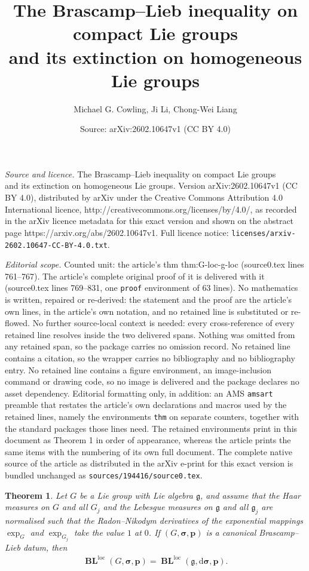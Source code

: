 \documentclass[10pt,a4paper]{amsart}
\title{The Brascamp--Lieb inequality on compact Lie groups \\ and its extinction on homogeneous Lie groups}
\author{Michael G. Cowling, Ji Li, Chong-Wei Liang}
\date{Source: arXiv:2602.10647v1 (CC BY 4.0)}
\newtheorem{thm}{Theorem}
\newcommand{\BL}{\operatorname{\mathbf{BL}}}
\newcommand{\Lie}[1]{\mathfrak{#1}}
\newcommand{\bsDs}{\boldsymbol{\mathrm{d}\sigma}}
\newcommand{\bsp}{\boldsymbol{p}}
\newcommand{\bss}{\boldsymbol{\sigma}}
\newcommand{\loc}{\mathrm{loc}}
\begin{document}
\maketitle

\noindent\emph{Source and licence.} The Brascamp--Lieb inequality on compact Lie groups \\ and its extinction on homogeneous Lie groups. Version arXiv:2602.10647v1 (CC BY 4.0), distributed by arXiv under the Creative Commons Attribution 4.0 International licence, http://creativecommons.org/licenses/by/4.0/, as recorded in the arXiv licence metadata for this exact version and shown on the abstract page https://arxiv.org/abs/2602.10647v1. Full licence notice: \texttt{licenses/arxiv-2602.10647-CC-BY-4.0.txt}.\par\smallskip

\noindent\textit{Editorial scope.} Counted unit: the article's thm thm:G-loc-g-loc (source0.tex lines 761--767). The article's complete original proof of it is delivered with it (source0.tex lines 769--831, one \texttt{proof} environment of 63 lines). No mathematics is written, repaired or re-derived: the statement and the proof are the article's own lines, in the article's own notation, and no retained line is substituted or re-flowed.  No further source-local context is needed: every cross-reference of every retained line resolves inside the two delivered spans.  Nothing was omitted from any retained span, so the package carries no omission record.  No retained line contains a citation, so the wrapper carries no bibliography and no bibliography entry.  No retained line contains a figure environment, an image-inclusion command or drawing code, so no image is delivered and the package declares no asset dependency.  Editorial formatting only, in addition: an AMS \texttt{amsart} preamble that restates the article's own declarations and macros used by the retained lines, namely the environments \texttt{thm} on separate counters, together with the standard packages those lines need.  The retained environments print in this document as Theorem 1 in order of appearance, whereas the article prints the same items with the numbering of its own full document.  The complete native source of the article as distributed in the arXiv e-print for this exact version is bundled unchanged as \texttt{sources/194416/source0.tex}.
\begin{thm}\label{thm:G-loc-g-loc}
Let $G$ be a Lie group with Lie algebra $\Lie{g}$, and assume that the Haar measures on $G$ and all $G_j$ and the Lebesgue measures on $\Lie{g}$ and all $\Lie{g}_j$ are normalised such that the Radon--Nikodym derivatives of the exponential mappings $\exp_G$ and $\exp_{G_j}$ take the value $1$ at $0$.
If $(G,\bss ,\bsp)$ is a canonical Brascamp--Lieb datum, then 
\begin{align*}
\BL^{\loc}(G,\bss ,\bsp) = \BL^{\loc}(\Lie{g},\bsDs ,\bsp).
\end{align*}
\end{thm}
\end{document}
